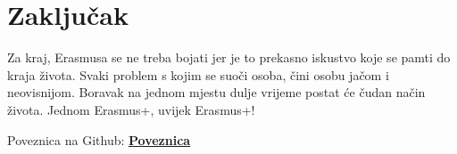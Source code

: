 \documentclass[]{foi}
\begin{document}
\chapter{Zaključak}











Za kraj, Erasmusa se ne treba bojati jer je to prekasno iskustvo koje se pamti do kraja života. Svaki problem s kojim se suoči osoba, čini osobu jačom i neovisnijom. 
Boravak na jednom mjestu dulje vrijeme postat će čudan način života. Jednom Erasmus+, uvijek Erasmus+!

Poveznica na Github: \href{https://github.com/ababic20/Website-with-a-chatbot.git}{\textbf{Poveznica}} 

\makebackmatter
\end{document}
